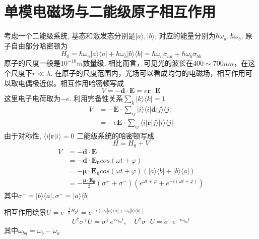 \documentclass{article}
\begin{document}
\section{单模电磁场与二能级原子相互作用}
考虑一个二能级系统, 基态和激发态分别是$|a\rangle,|b\rangle$, 对应的能量分别为$\hbar \omega_a,\hbar \omega_b$, 原子自由部分哈密顿为
\begin{equation*}
  H_0=\hbar\omega_a|a\rangle\langle a|+\hbar\omega_b|b\rangle\langle b|=\hbar\omega_a\sigma_{aa}+\hbar\omega_b\sigma_{bb}
\end{equation*}
原子的尺度一般是$10^{-10}m$数量级, 相比而言，可见光的波长在$400\sim700nm$，在这个尺度下$r\ll\lambda$. 在原子的尺度范围内，光场可以看成均匀的电磁场，相互作用可以取电偶极近似。相互作用哈密顿写成
\begin{equation*}
  V=-\mathbf{d}\cdot\mathbf{E}=e\mathbf{r}\cdot\mathbf{E}
\end{equation*}
这里电子电荷取为$-e$.
利用完备性关系$\sum_{k}|k\rangle\langle k|=1$
\begin{equation*}
  \begin{split}
     V&=-\mathbf{E}\cdot\sum_{ij}|i\rangle\langle i|\mathbf{d}|j\rangle\langle j|\\
       &=-e\mathbf{E}\cdot\sum_{ij}\langle i|\mathbf{r}|j\rangle|i\rangle\langle j|
  \end{split}
\end{equation*}
由于对称性, $\langle i|\mathbf{r}|i\rangle=0$
二能级系统的哈密顿写成
\begin{equation*}
  H=H_0+V
\end{equation*}
\begin{equation*}
  \begin{split}
     V&=-\mathbf{d}\cdot\mathbf{E}\\
       &=-\mathbf{d}\cdot\mathbf{E_0}cos(\omega t+\varphi)\\
       &=-\mathbf{\mu}\cdot\mathbf{E_0}cos(\omega t+\varphi)(|a\rangle\langle b|+|b\rangle\langle a|)\\
       &=-\frac{\mathbf{\mu}\cdot\mathbf{E_0}}{2}(\sigma^++\sigma^-)(e^{\omega t+\varphi}+e^{-i(\omega t+\varphi)})
  \end{split}
\end{equation*}
其中$\sigma^+=|b\rangle\langle a|,\sigma^-=|a\rangle\langle b|$

相互作用绘景$U=e^{-\frac{i}{\hbar}H_0 t}=e^{-i(\omega_a|a\rangle\langle a|+\omega_b|b\rangle\langle b|)}$
\begin{equation*}
  U^\dag\sigma^+U=\sigma^+e^{i\omega_{ba}t},\quad U^\dag\sigma^-U=\sigma^-e^{-i\omega_{ba}t}
\end{equation*}
其中$\omega_{ba}=\omega_b-\omega_a$
\end{document}
